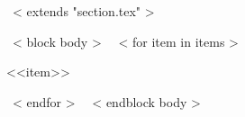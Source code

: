 ~< extends "section.tex" >~

~< block body >~
~< for item in items >~
  \begin{inparaitem}
    \item <<item>>
  \end{inparaitem}
~< endfor >~
~< endblock body >~
